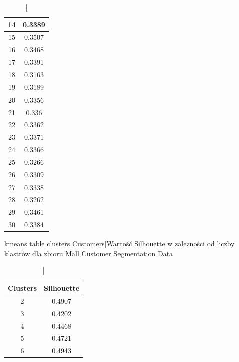 \documentclass{classrep}
\begin{document}
{{\begin{table}[!htbp]
\begin{minipage}{.24\textwidth}
\begin{tabular}{|c|c|}
                        14 & 0.3389 \\ \hline
                        15 & 0.3507 \\ \hline
                        16 & 0.3468 \\ \hline
                        17 & 0.3391 \\ \hline
                        18 & 0.3163 \\ \hline
                        19 & 0.3189 \\ \hline
                        20 & 0.3356 \\ \hline
                        21 & 0.336 \\ \hline
                        22 & 0.3362 \\ \hline
                        23 & 0.3371 \\ \hline
                        24 & 0.3366 \\ \hline
                        25 & 0.3266 \\ \hline
                        26 & 0.3309 \\ \hline
                        27 & 0.3338 \\ \hline
                        28 & 0.3262 \\ \hline
                        29 & 0.3461 \\ \hline
                        30 & 0.3384 \\ \hline
                    \end{tabular}
                    \caption
                    [kmeans table clusters Customers]{Wartość Silhouette w zależności
                    od liczby klastrów dla zbioru Mall Customer Segmentation Data}
                    \label{kmeans_table_clusters_Customers}
                \end{minipage}
                \hfill
                \begin{minipage}{.24\textwidth}
                    \centering
                    \begin{tabular}{|c|c|}
                        \hline
                        Clusters & Silhouette \\ \hline
                        2 & 0.4907 \\ \hline
                        3 & 0.4202 \\ \hline
                        4 & 0.4468 \\ \hline
                        5 & 0.4721 \\ \hline
                        6 & 0.4943 \\ \hline

\end{tabular}
\end{minipage}
\end{table}}}
\end{document}
